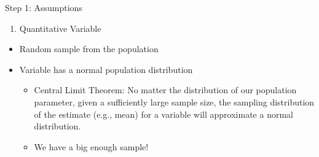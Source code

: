\documentclass[
  8pt,
  ignorenonframetext,
  dvipsnames]{beamer}
\providecommand{\tightlist}{%
  \setlength{\itemsep}{0pt}\setlength{\parskip}{0pt}}
\let\olditem\item
\renewcommand{\item}{%
  \olditem\vspace{4pt}
}
\begin{document}
\begin{frame}{Step 1: Assumptions}
\protect\hypertarget{step-1-assumptions}{}

\begin{enumerate}
\tightlist
\item
  Quantitative Variable
\end{enumerate}

\begin{itemize}
\tightlist
\item
  Random sample from the population
\item
  Variable has a normal population distribution

  \begin{itemize}
  \tightlist
  \item
    Central Limit Theorem: No matter the distribution of our population
    parameter, given a sufficiently large sample size, the sampling
    distribution of the estimate (e.g., mean) for a variable will
    approximate a normal distribution.
  \item
    We have a big enough sample!
  \end{itemize}
\end{itemize}

\end{frame}
\end{document}
